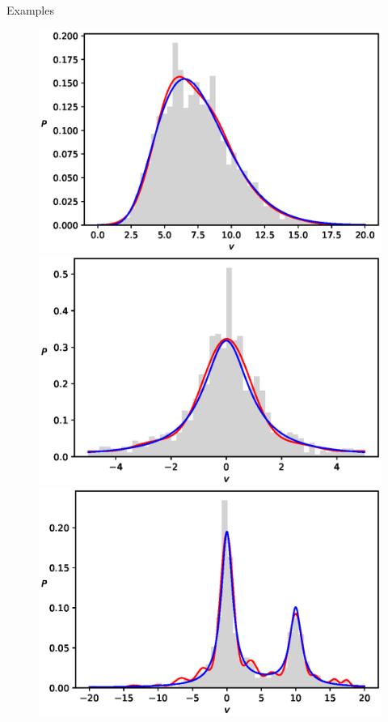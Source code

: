 \documentclass[10pt]{beamer}
\begin{document}
\begin{frame}{Examples}
    \begin{figure}[t!]
        \begin{center}
        \includegraphics[scale=0.30]{figures/GammaDist}
        \includegraphics[scale=0.30]{figures/CauchyDist}
        \includegraphics[scale=0.30]{figures/CauchyMix}

\end{center}
\end{figure}
\end{frame}
\end{document}

